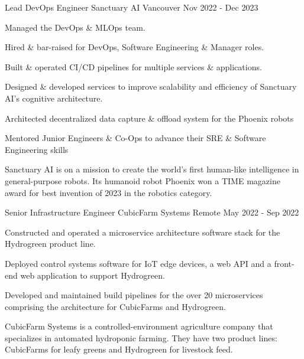 
\begin{cventries}

\cventrywithsummary
{Lead DevOps Engineer} %
{Sanctuary AI} %
{Vancouver} %
{Nov 2022 - Dec 2023} %
{
  \begin{cvitems} %
    \item {Managed the DevOps \& MLOps team.}
    \item {Hired \& bar-raised for DevOps, Software Engineering \& Manager roles.}
    \item {Built \& operated CI/CD pipelines for multiple services \& applications.}
    \item {Designed \& developed services to improve scalability and efficiency of Sanctuary AI's cognitive architecture.}
    \item {Architected decentralized data capture \& offload system for the Phoenix robots}
    \item {Mentored Junior Engineers \& Co-Ops to advance their SRE \& Software Engineering skills}
  \end{cvitems}
}
{
  Sanctuary AI is on a mission to create the world's first human-like intelligence in general-purpose robots.
  Its humanoid robot Phoenix won a TIME magazine award for best invention of 2023 in the robotics category.
}

\cventrywithsummary
{Senior Infrastructure Engineer} %
{CubicFarm Systems} %
{Remote} %
{May 2022 - Sep 2022} %
{
  \begin{cvitems} %
    \item {Constructed and operated a microservice architecture software stack for the Hydrogreen product line.}
    \item {Deployed control systems software for IoT edge devices, a web API and a front-end web application to support Hydrogreen.}
    \item {Developed and maintained build pipelines for the over 20 microservices comprising the architecture for CubicFarms and Hydrogreen.}
  \end{cvitems}
}
{
  CubicFarm Systems is a controlled-environment agriculture company that specializes in automated hydroponic farming.
  They have two product lines: CubicFarms for leafy greens and Hydrogreen for livestock feed.
}


\end{cventries}
